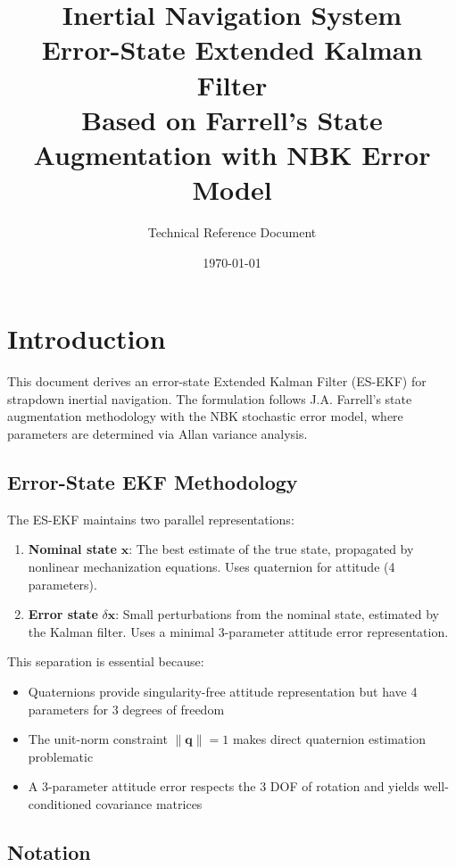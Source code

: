 \documentclass[11pt,a4paper]{article}
\title{\textbf{Inertial Navigation System}\\[0.5em]
\Large Error-State Extended Kalman Filter\\[0.3em]
\large Based on Farrell's State Augmentation with NBK Error Model}
\author{Technical Reference Document}
\date{\today}
\newcommand{\mat}[1]{\mathbf{#1}}
\newcommand{\quat}[1]{\mathbf{#1}}
\begin{document}
\maketitle
\tableofcontents
\newpage

\section{Introduction}

This document derives an error-state Extended Kalman Filter (ES-EKF) for strapdown inertial navigation. The formulation follows J.A. Farrell's state augmentation methodology with the NBK stochastic error model, where parameters are determined via Allan variance analysis.

\subsection{Error-State EKF Methodology}

The ES-EKF maintains two parallel representations:

\begin{enumerate}
    \item \textbf{Nominal state} $\mat{x}$: The best estimate of the true state, propagated by nonlinear mechanization equations. Uses quaternion for attitude (4 parameters).
    
    \item \textbf{Error state} $\delta\mat{x}$: Small perturbations from the nominal state, estimated by the Kalman filter. Uses a minimal 3-parameter attitude error representation.
\end{enumerate}

This separation is essential because:
\begin{itemize}
    \item Quaternions provide singularity-free attitude representation but have 4 parameters for 3 degrees of freedom
    \item The unit-norm constraint $\|\quat{q}\| = 1$ makes direct quaternion estimation problematic
    \item A 3-parameter attitude error respects the 3 DOF of rotation and yields well-conditioned covariance matrices
\end{itemize}

\subsection{Notation}
\end{document}

